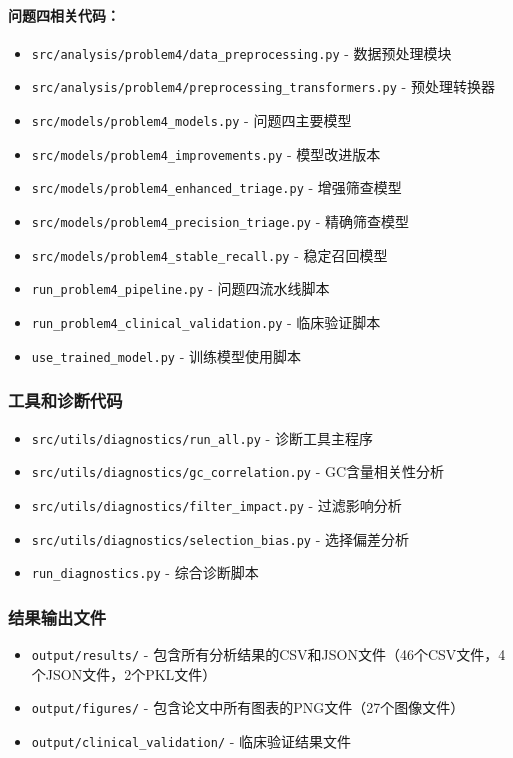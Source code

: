 \documentclass[withoutpreface]{cumcmthesis}
\begin{document}
\paragraph{问题四相关代码：}
\begin{itemize}
    \item \texttt{src/analysis/problem4/data\_preprocessing.py} - 数据预处理模块
    \item \texttt{src/analysis/problem4/preprocessing\_transformers.py} - 预处理转换器
    \item \texttt{src/models/problem4\_models.py} - 问题四主要模型
    \item \texttt{src/models/problem4\_improvements.py} - 模型改进版本
    \item \texttt{src/models/problem4\_enhanced\_triage.py} - 增强筛查模型
    \item \texttt{src/models/problem4\_precision\_triage.py} - 精确筛查模型
    \item \texttt{src/models/problem4\_stable\_recall.py} - 稳定召回模型
    \item \texttt{run\_problem4\_pipeline.py} - 问题四流水线脚本
    \item \texttt{run\_problem4\_clinical\_validation.py} - 临床验证脚本
    \item \texttt{use\_trained\_model.py} - 训练模型使用脚本
\end{itemize}

\subsubsection{工具和诊断代码}
\begin{itemize}
    \item \texttt{src/utils/diagnostics/run\_all.py} - 诊断工具主程序
    \item \texttt{src/utils/diagnostics/gc\_correlation.py} - GC含量相关性分析
    \item \texttt{src/utils/diagnostics/filter\_impact.py} - 过滤影响分析
    \item \texttt{src/utils/diagnostics/selection\_bias.py} - 选择偏差分析
    \item \texttt{run\_diagnostics.py} - 综合诊断脚本
\end{itemize}

\subsubsection{结果输出文件}
\begin{itemize}
    \item \texttt{output/results/} - 包含所有分析结果的CSV和JSON文件（46个CSV文件，4个JSON文件，2个PKL文件）
    \item \texttt{output/figures/} - 包含论文中所有图表的PNG文件（27个图像文件）
    \item \texttt{output/clinical\_validation/} - 临床验证结果文件
\end{itemize}
\end{document}
